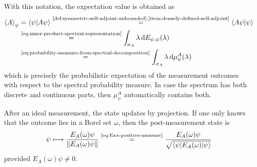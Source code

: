 With this notation, the expectation value is obtained as 
\[
\begin{aligned}
\braket{A}_{\psi}
&=
\braket{\psi|A\psi}
\overset{\text{\ref{def:symmetric-self-adjoint-unbounded}.\ref{item:densely-defined-self-adjoint}}}{=}
\braket{A\psi|\psi}
\\
&\overset{\text{\eqref{eq:inner-product-spectral-representation}}}{=}
\int_{\sigma_A} \lambda \,\mathrm{d} E_{\psi,\psi}(\lambda)
\\
&\overset{\text{\eqref{eq:probability-measure-from-spectral-decomposition}}}{=}
\int_{\sigma_A} \lambda \,\mathrm{d} \mu_\psi^A(\lambda)
\end{aligned}
\]
which is precisely the probabilistic expectation of the measurement outcomes with respect to the spectral probability measure.
In case the spectrum has both discrete and continuous parts, then $\mu_\psi^A$ automatically contains both.


After an ideal measurement, the state updates by projection.
If one only knows that the outcome lies in a Borel set $\omega$, then the post-measurement state is
\begin{equation}\label{eq:post-measurement-state}
\psi
\longmapsto
\frac{E_A(\omega)\psi}{\|E_A(\omega)\psi\|}
\overset{\text{\eqref{eq:Exx-positive-measure}}}{=}
\frac{E_A(\omega)\psi}{\sqrt{\braket{\psi|E_A(\omega)|\psi}}}
\end{equation}
provided $E_A(\omega)\psi \neq 0$.







